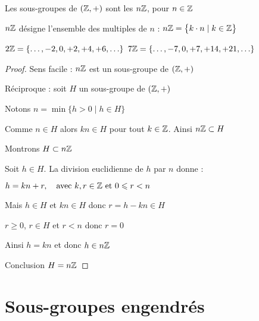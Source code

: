 \begin{frame}

\begin{proposition}
Les sous-groupes de $(\mathbb{Z},+)$ sont les $n\mathbb{Z}$, pour $n\in \mathbb{Z}$
\end{proposition}

\pause

$n\mathbb{Z}$ désigne l'ensemble des multiples de $n$ : $n\mathbb{Z} = \big\{ k\cdot n \mid  k \in \mathbb{Z} \big\}$

{\small
\pause
$2\mathbb{Z} = \{\ldots, -2,0,+2,+4,+6,\ldots\}$
\pause \hfill
$7\mathbb{Z} =  \{\ldots, -7,0,+7,+14,+21,\ldots\}$
}

\pause

\begin{proof}

Sens facile : $n\mathbb{Z}$ est un sous-groupe de $(\mathbb{Z},+)$

\pause
\medskip
 
Réciproque : soit $H$ un sous-groupe de $(\mathbb{Z},+)$

Notons $n=\min \{ h > 0 \mid h \in H \}$

\pause

Comme $n\in H$ alors $kn \in H$ pour tout $k \in \mathbb{Z}$. Ainsi $n\mathbb{Z} \subset H$

\pause
\medskip

Montrons $H \subset n\mathbb{Z}$

Soit $h \in H$. La division euclidienne de $h$ par $n$ donne :

\centerline{$h = kn + r,\quad \text{avec } k,r \in \mathbb{Z}  \text{ et } 0 \leqslant r < n$}

Mais $h\in H$ et $kn \in H$ donc $r= h - kn \in H$

$r \ge 0$, $r \in H$ et $r <n$ donc $r=0$

Ainsi $h=kn$ et donc $h\in n\mathbb{Z}$

\pause
\medskip

Conclusion $H=n\mathbb{Z}$
\end{proof}  
\end{frame}





\section*{Sous-groupes engendrés}

